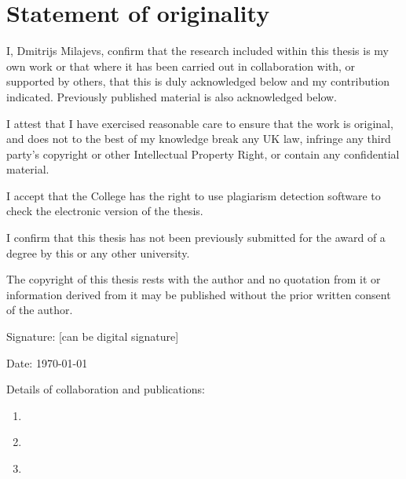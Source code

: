 \chapter*{Statement of originality}

I, Dmitrijs Milajevs, confirm that the research included within this thesis is my own work or that where it has been carried out in collaboration with, or supported by others, that this is duly acknowledged below and my contribution indicated. Previously published material is also acknowledged below.

I attest that I have exercised reasonable care to ensure that the work is original, and does not to the best of my knowledge break any UK law, infringe any third party’s copyright or other Intellectual Property Right, or contain any confidential material.

I accept that the College has the right to use plagiarism detection software to check the electronic version of the thesis.

I confirm that this thesis has not been previously submitted for the award of a degree by this or any other university.

The copyright of this thesis rests with the author and no quotation from it or information derived from it may be published without the prior written consent of the author.

Signature: [can be digital signature]

Date: \today

Details of collaboration and publications:
\begin{enumerate}
\item \citet*{milajevs-purver:2014:CVSC}
\item \citet*{milajevs-EtAl:2014:EMNLP2014}
\item \citet*{Milajevs:2015:IMN:2808194.2809448}
\end{enumerate}

